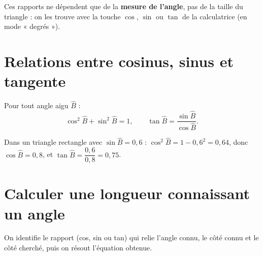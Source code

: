 \begin{illus}
\end{illus}

\begin{remarque}
Ces rapports ne dépendent que de la \textbf{mesure de l'angle}, pas de la taille du
triangle : on les trouve avec la touche $\cos$, $\sin$ ou $\tan$ de la calculatrice (en mode
« degrés »).
\end{remarque}

\section{Relations entre cosinus, sinus et tangente}

\begin{propriete}[Relations]
Pour tout angle aigu $\widehat B$ :
\[
\cos^{2}\widehat B+\sin^{2}\widehat B=1, \qquad \tan\widehat B=\frac{\sin\widehat B}{\cos\widehat B}.
\]
\end{propriete}

\begin{exemple}
Dans un triangle rectangle avec $\sin\widehat B=0{,}6$ : $\cos^{2}\widehat B=1-0{,}6^{2}=0{,}64$,
donc $\cos\widehat B=0{,}8$, et $\tan\widehat B=\dfrac{0{,}6}{0{,}8}=0{,}75$.
\end{exemple}

\section{Calculer une longueur connaissant un angle}

\begin{propriete}[Méthode]
On identifie le rapport (cos, sin ou tan) qui relie l'angle connu, le côté connu et le
côté cherché, puis on résout l'équation obtenue.
\end{propriete}

